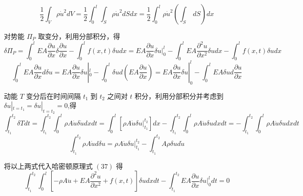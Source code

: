 \documentclass[12pt,a4paper]{article}
\begin{document}
$$
\frac{1}{2}\int_{V}\rho\dot{u}^2dV=\frac{1}{2}\int_{0}^{l}\int_{S}\rho\dot{u}^2dSdx=\frac{1}{2}\int_{0}^{l}\rho\dot{u}^2\left(\int_{S}~dS\right)dx
$$

对势能 $\Pi _P$ 取变分，利用分部积分，得
$$
\delta\Pi _P=\int_{0}^{l}EA\frac{\partial u}{\partial x}\delta\frac{\partial u}{\partial x}-\int_{0}^{l}f(x,t)\delta udx=EA\frac{\partial u}{\partial x}\delta u |^l_0-\int_{0}^{l}EA\frac{\partial^2 u}{\partial x^2}\delta udx-\int_{0}^{l}f(x,t)\delta udx
$$
$$
\int_{0}^{l}EA\frac{\partial u}{\partial x}d\delta u=EA\frac{\partial u}{\partial x}\delta u|^l_0-\int_{0}^{l}\delta ud\left(EA\frac{\partial u}{\partial x}\right)=EA\frac{\partial u}{\partial x}\delta u|^l_0-\int_{0}^{l}EA\delta ud\frac{\partial u}{\partial x}
$$

动能 $T$ 变分后在时间间隔 $t_1$ 到 $t_2$ 之间对 $t$ 积分，利用分部积分并考虑到 $\delta u|_{t=t_1}=\delta u|_{t=t_2}=0$,得
$$
\int_{t_1}^{t_2}\delta Tdt=\int_{t_1}^{t_2}\int_{0}^{l}\rho A\dot{u}\delta\dot{u}dxdt=\int_{0}^{l}\left[\rho A\dot{u}\delta u|^{t_2}_{t_1}\right]dx-\int_{t_1}^{t_2}\int_{0}^{l}\rho A\ddot{u}\delta udxdt=-\int_{t_1}^{t_2}\int_{0}^{l}\rho A\ddot{u}\delta udxdt
$$
$$
\int_{t_1}^{t_2}\rho A\dot{u}d\delta u=\rho A\dot{u}\delta u|_{t_1}^{t_2}-\int_{t_1}^{t_2}A\rho\delta ud\dot{u}
$$

将以上两式代入哈密顿原理式 $(37)$ 得
$$
\int_{t_1}^{t_2}\int_{0}^{l}\left[-\rho A\ddot{u}+EA\frac{\partial^2 u}{\partial x^2}+f(x,t)\right]\delta udxdt-\int_{t_1}^{t_2}EA\frac{\partial u}{\partial x}\delta u|_{0}^{l}dt=0
$$
\end{document}
